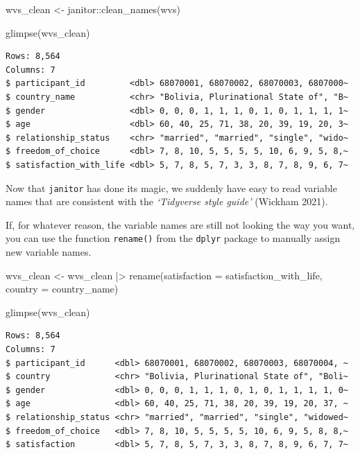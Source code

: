 \documentclass[
  letterpaper,
]{krantz}
\makeatletter
\newenvironment{Shaded}{\begin{snugshade}}{\end{snugshade}}
\newcommand{\AttributeTok}[1]{\textcolor[rgb]{0.40,0.45,0.13}{#1}}
\newcommand{\FunctionTok}[1]{\textcolor[rgb]{0.28,0.35,0.67}{#1}}
\newcommand{\NormalTok}[1]{\textcolor[rgb]{0.00,0.23,0.31}{#1}}
\newcommand{\OtherTok}[1]{\textcolor[rgb]{0.00,0.23,0.31}{#1}}
\newcommand{\SpecialCharTok}[1]{\textcolor[rgb]{0.37,0.37,0.37}{#1}}
\newenvironment{kframe}{%
\medskip{}
\setlength{\fboxsep}{.8em}
 \def\at@end@of@kframe{}%
 \ifinner\ifhmode%
  \def\at@end@of@kframe{\end{minipage}}%
  \begin{minipage}{\columnwidth}%
 \fi\fi%
 \def\FrameCommand##1{\hskip\@totalleftmargin \hskip-\fboxsep
 \colorbox{shadecolor}{##1}\hskip-\fboxsep
     \hskip-\linewidth \hskip-\@totalleftmargin \hskip\columnwidth}%
 \MakeFramed {\advance\hsize-\width
   \@totalleftmargin\z@ \linewidth\hsize
   \@setminipage}}%
 {\par\unskip\endMakeFramed%
 \at@end@of@kframe}
\renewenvironment{Shaded}{\begin{kframe}}{\end{kframe}}
\makeatother
\begin{document}
\begin{Shaded}
\begin{Highlighting}[]
\NormalTok{wvs\_clean }\OtherTok{\textless{}{-}}\NormalTok{ janitor}\SpecialCharTok{::}\FunctionTok{clean\_names}\NormalTok{(wvs)}

\FunctionTok{glimpse}\NormalTok{(wvs\_clean)}
\end{Highlighting}
\end{Shaded}

\begin{verbatim}
Rows: 8,564
Columns: 7
$ participant_id         <dbl> 68070001, 68070002, 68070003, 6807000~
$ country_name           <chr> "Bolivia, Plurinational State of", "B~
$ gender                 <dbl> 0, 0, 0, 1, 1, 1, 0, 1, 0, 1, 1, 1, 1~
$ age                    <dbl> 60, 40, 25, 71, 38, 20, 39, 19, 20, 3~
$ relationship_status    <chr> "married", "married", "single", "wido~
$ freedom_of_choice      <dbl> 7, 8, 10, 5, 5, 5, 5, 10, 6, 9, 5, 8,~
$ satisfaction_with_life <dbl> 5, 7, 8, 5, 7, 3, 3, 8, 7, 8, 9, 6, 7~
\end{verbatim}

Now that \texttt{janitor} has done its magic, we suddenly have easy to
read variable names that are consistent with the \emph{`Tidyverse style
guide'} (Wickham 2021).

If, for whatever reason, the variable names are still not looking the
way you want, you can use the function \texttt{rename()} from the
\texttt{dplyr} package to manually assign new variable names.

\begin{Shaded}
\begin{Highlighting}[]
\NormalTok{wvs\_clean }\OtherTok{\textless{}{-}} 
\NormalTok{  wvs\_clean }\SpecialCharTok{|\textgreater{}}
  \FunctionTok{rename}\NormalTok{(}\AttributeTok{satisfaction =}\NormalTok{ satisfaction\_with\_life,}
         \AttributeTok{country =}\NormalTok{ country\_name)}

\FunctionTok{glimpse}\NormalTok{(wvs\_clean)}
\end{Highlighting}
\end{Shaded}

\begin{verbatim}
Rows: 8,564
Columns: 7
$ participant_id      <dbl> 68070001, 68070002, 68070003, 68070004, ~
$ country             <chr> "Bolivia, Plurinational State of", "Boli~
$ gender              <dbl> 0, 0, 0, 1, 1, 1, 0, 1, 0, 1, 1, 1, 1, 0~
$ age                 <dbl> 60, 40, 25, 71, 38, 20, 39, 19, 20, 37, ~
$ relationship_status <chr> "married", "married", "single", "widowed~
$ freedom_of_choice   <dbl> 7, 8, 10, 5, 5, 5, 5, 10, 6, 9, 5, 8, 8,~
$ satisfaction        <dbl> 5, 7, 8, 5, 7, 3, 3, 8, 7, 8, 9, 6, 7, 7~
\end{verbatim}
\end{document}
